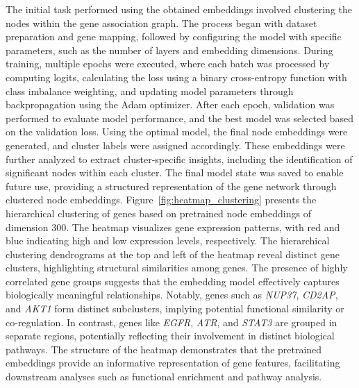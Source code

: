 The initial task performed using the obtained embeddings involved clustering the nodes within the gene association graph. The process began with dataset preparation and gene mapping, followed by configuring the model with specific parameters, such as the number of layers and embedding dimensions. During training, multiple epochs were executed, where each batch was processed by computing logits, calculating the loss using a binary cross-entropy function with class imbalance weighting, and updating model parameters through backpropagation using the Adam optimizer. After each epoch, validation was performed to evaluate model performance, and the best model was selected based on the validation loss.
Using the optimal model, the final node embeddings were generated, and cluster labels were assigned accordingly. These embeddings were further analyzed to extract cluster-specific insights, including the identification of significant nodes within each cluster. The final model state was saved to enable future use, providing a structured representation of the gene network through clustered node embeddings.
Figure~\ref{fig:heatmap_clustering} presents the hierarchical clustering of genes based on pretrained node embeddings of dimension 300. The heatmap visualizes gene expression patterns, with red and blue indicating high and low expression levels, respectively. 
The hierarchical clustering dendrograms at the top and left of the heatmap reveal distinct gene clusters, highlighting structural similarities among genes. The presence of highly correlated gene groups suggests that the embedding model effectively captures biologically meaningful relationships.
Notably, genes such as \textit{NUP37}, \textit{CD2AP}, and \textit{AKT1} form distinct subclusters, implying potential functional similarity or co-regulation. In contrast, genes like \textit{EGFR}, \textit{ATR}, and \textit{STAT3} are grouped in separate regions, potentially reflecting their involvement in distinct biological pathways.
The structure of the heatmap demonstrates that the pretrained embeddings provide an informative representation of gene features, facilitating downstream analyses such as functional enrichment and pathway analysis.


